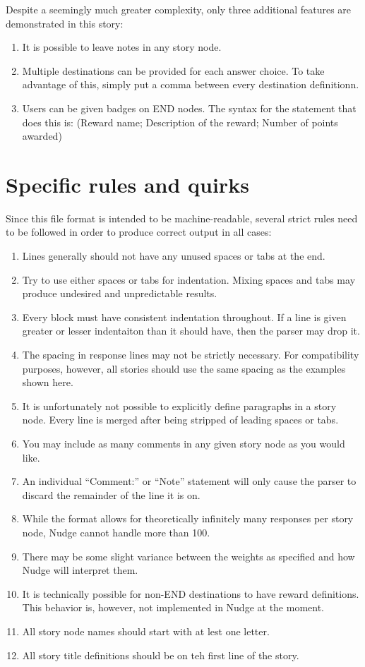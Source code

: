 \documentclass[12pt,letterpaper]{article}
\begin{document}
Despite a seemingly much greater complexity, only three additional features are demonstrated in this story:
\begin{enumerate}
 \item It is possible to leave notes in any story node.
 \item Multiple destinations can be provided for each answer choice. To take advantage of this, simply put a comma between every destination definitionn.
 \item Users can be given badges on END nodes. The syntax for the statement that does this is: (Reward name; Description of the reward; Number of points awarded)
\end{enumerate}

\section{Specific rules and quirks}
Since this file format is intended to be machine-readable, several strict rules need to be followed in order to produce correct output in all cases\footnotemark[3]:

\begin{enumerate}
 \item Lines generally should not have any unused spaces or tabs at the end.
 \item Try to use either spaces or tabs for indentation. Mixing spaces and tabs may produce undesired and unpredictable results.
 \item Every block must have consistent indentation throughout. If a line is given greater or lesser indentaiton than it should have, then the parser may drop it.
 \item The spacing in response lines may not be strictly necessary. For compatibility purposes, however, all stories should use the same spacing as the examples shown here.
 \item It is unfortunately not possible to explicitly define paragraphs in a story node. Every line is merged after being stripped of leading spaces or tabs.
 \item You may include as many comments in any given story node as you would like.
 \item An individual ``Comment:'' or ``Note'' statement will only cause the parser to discard the remainder of the line it is on.
 \item While the format allows for theoretically infinitely many responses per story node, Nudge cannot handle more than 100.
 \item There may be some slight variance between the weights as specified and how Nudge will interpret them.
 \item It is technically possible for non-END destinations to have reward definitions. This behavior is, however, not implemented in Nudge at the moment.
 \item All story node names should start with at lest one letter.
 \item All story title definitions should be on teh first line of the story.
\end{enumerate}
    
    
\end{document}
